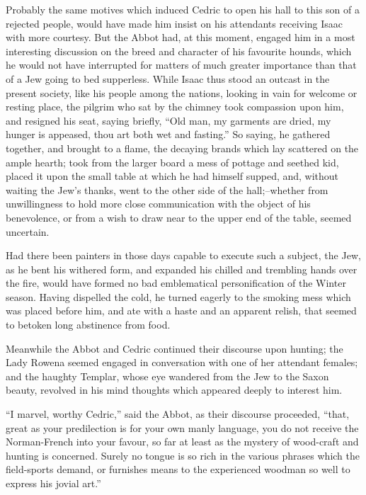 Probably the same motives which induced Cedric to open his hall to this
son of a rejected people, would have made him insist on his attendants
receiving Isaac with more courtesy. But the Abbot had, at this moment,
engaged him in a most interesting discussion on the breed and character
of his favourite hounds, which he would not have interrupted for matters
of much greater importance than that of a Jew going to bed supperless.
While Isaac thus stood an outcast in the present society, like his
people among the nations, looking in vain for welcome or resting place,
the pilgrim who sat by the chimney took compassion upon him, and
resigned his seat, saying briefly, ``Old man, my garments are dried, my
hunger is appeased, thou art both wet and fasting.'' So saying, he
gathered together, and brought to a flame, the decaying brands which lay
scattered on the ample hearth; took from the larger board a mess of
pottage and seethed kid, placed it upon the small table at which he had
himself supped, and, without waiting the Jew's thanks, went to the other
side of the hall;--whether from unwillingness to hold more close
communication with the object of his benevolence, or from a wish to draw
near to the upper end of the table, seemed uncertain.

Had there been painters in those days capable to execute such a subject,
the Jew, as he bent his withered form, and expanded his chilled and
trembling hands over the fire, would have formed no bad emblematical
personification of the Winter season. Having dispelled the cold, he
turned eagerly to the smoking mess which was placed before him, and ate
with a haste and an apparent relish, that seemed to betoken long
abstinence from food.

Meanwhile the Abbot and Cedric continued their discourse upon hunting;
the Lady Rowena seemed engaged in conversation with one of her attendant
females; and the haughty Templar, whose eye wandered from the Jew to the
Saxon beauty, revolved in his mind thoughts which appeared deeply to
interest him.

``I marvel, worthy Cedric,'' said the Abbot, as their discourse
proceeded, ``that, great as your predilection is for your own manly
language, you do not receive the Norman-French into your favour, so far
at least as the mystery of wood-craft and hunting is concerned. Surely
no tongue is so rich in the various phrases which the field-sports
demand, or furnishes means to the experienced woodman so well to express
his jovial art.''

